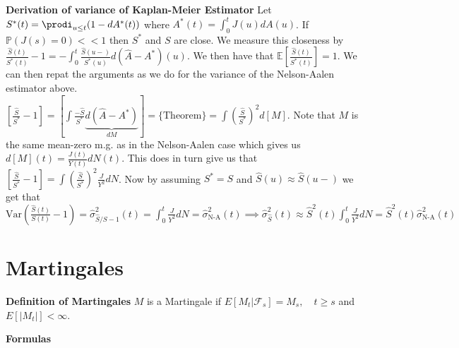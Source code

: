 \documentclass{article}
\begin{document}
\medskip

\textbf{Derivation of variance of Kaplan-Meier Estimator} 
Let $S^*(t) = \prodi_{u\leq t} (1-dA^*(t))$ where $A^*(t) = \int_0^t J(u)dA(u)$. If $\mathbb{P}(J(s) = 0) << 1$ then $S^*$ and $S$ are close. We measure this closeness by $\frac{\hat{S}(t)}{S^*(t)} - 1 = -\int_0^t \frac{\hat{S}(u-)}{S^*(u)}d(\hat{A} - A^*)(u)$. We then have that $\mathbb{E}\left[\frac{\hat{S}(t)}{S^*(t)}\right] = 1$. We can then repat the arguments as we do for the variance of the Nelson-Aalen estimator above. $\left[\frac{\hat{S}}{S^*} - 1\right] = \left[\int \frac{-\hat{S}}{S^*}\underbrace{d(\hat{A} - A^*)}_{dM}\right] = \{\text{Theorem}\} = \int \left(\frac{\hat{S}}{S^*}\right)^2d[M]$. Note that $M$ is the same mean-zero m.g. as in the Nelson-Aalen case which gives us $d[M](t)=\frac{J(t)}{Y(t)}dN(t)$. This does in turn give us that $\left[\frac{\hat{S}}{S^*}-1\right] = \int \left(\frac{\hat{S}}{S^*}\right)^2 \frac{J}{Y^2}dN$. Now by assuming $S^* = S$ and $\hat{S}(u) \approx \hat{S}(u-)$ we get that $\text{Var}\left(\frac{\hat{S}(t)}{S(t)} - 1\right) = \hat\sigma^2_{\hat{S}/S- 1}(t) = \int_0^t \frac{J}{Y^2}dN = \hat\sigma^2_{\text{N-A}}(t) \implies \hat\sigma^2_{\hat{S}}(t) \approx \hat{S}^2(t)\int_0^t \frac{J}{Y^2}dN = \hat{S}^2(t)\hat\sigma^2_{\text{N-A}}(t)$

\newpage

\section*{Martingales}

\textbf{Definition of Martingales} $M$ is a Martingale if $E[M_t | \mathcal{F}_{s}] = M_s, \quad t\geq s$ and $E[|M_t|] < \infty$. 

\medskip

\textbf{Formulas} 
\end{document}
